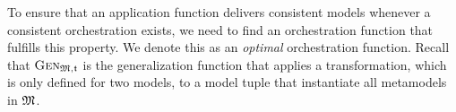 To ensure that an application function delivers consistent models whenever a consistent orchestration exists, we need to find an orchestration function that fulfills this property.
We denote this as an \emph{optimal} orchestration function.
Recall that $\generalizationfunction{\metamodeltuple{M},\transformation{t}}$ is the generalization function that applies a transformation, which is only defined for two models, to a model tuple that instantiate all metamodels in $\metamodeltuple{M}$.



